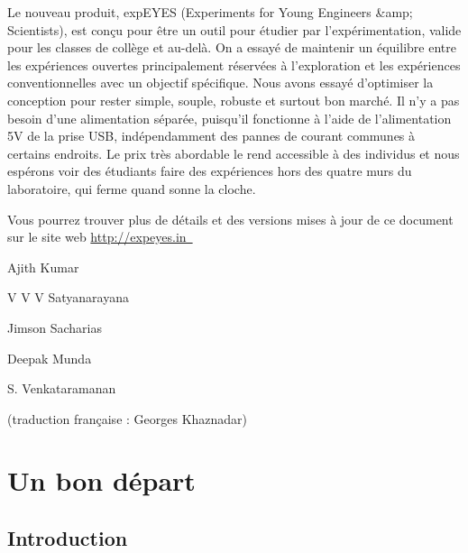 \documentclass{book}
\begin{document}
Le nouveau produit, expEYES (Experiments for Young Engineers \&amp; Scientists), est conçu pour être un outil pour étudier par l'expérimentation, valide pour les classes de collège et au-delà. On a essayé de maintenir un équilibre entre les expériences ouvertes principalement réservées à l'exploration et les expériences conventionnelles avec un objectif spécifique. Nous avons essayé d'optimiser la conception pour rester simple, souple, robuste et surtout bon marché. Il n'y a pas besoin d'une alimentation séparée, puisqu'il fonctionne à l'aide de l'alimentation 5V de la prise USB, indépendamment des pannes de courant communes à certains endroits. Le prix très abordable le rend accessible à des individus et nous espérons voir des étudiants faire des expériences hors des quatre murs du laboratoire, qui ferme quand sonne la cloche.



Vous pourrez trouver plus de détails et des versions mises à jour de ce document sur le site web \href{http://expeyes.in
 }{\mbox{http://expeyes.in
} }








Ajith Kumar



V V V Satyanarayana



Jimson Sacharias



Deepak Munda



S. Venkataramanan



(traduction française : Georges Khaznadar)













\chapter{Un bon départ}



\section{Introduction}
\end{document}
